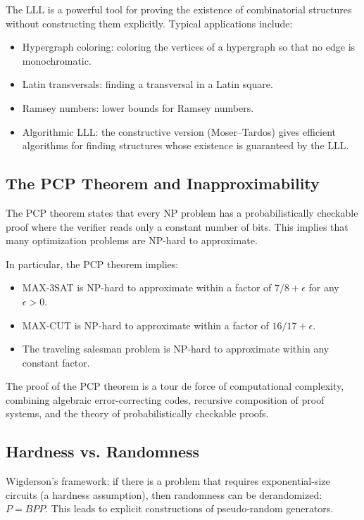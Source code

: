 The LLL is a powerful tool for proving the existence of combinatorial structures without constructing them explicitly. Typical applications include:
\begin{itemize}
\item Hypergraph coloring: coloring the vertices of a hypergraph so that no edge is monochromatic.
\item Latin transversals: finding a transversal in a Latin square.
\item Ramsey numbers: lower bounds for Ramsey numbers.
\item Algorithmic LLL: the constructive version (Moser--Tardos) gives efficient algorithms for finding structures whose existence is guaranteed by the LLL.
\end{itemize}

\subsection{The PCP Theorem and Inapproximability}

The PCP theorem states that every NP problem has a probabilistically checkable proof where the verifier reads only a constant number of bits. This implies that many optimization problems are NP-hard to approximate.

In particular, the PCP theorem implies:
\begin{itemize}
\item MAX-3SAT is NP-hard to approximate within a factor of $7/8 + \epsilon$ for any $\epsilon > 0$.
\item MAX-CUT is NP-hard to approximate within a factor of $16/17 + \epsilon$.
\item The traveling salesman problem is NP-hard to approximate within any constant factor.
\end{itemize}

The proof of the PCP theorem is a tour de force of computational complexity, combining algebraic error-correcting codes, recursive composition of proof systems, and the theory of probabilistically checkable proofs.

\subsection{Hardness vs. Randomness}

Wigderson's framework: if there is a problem that requires exponential-size circuits (a hardness assumption), then randomness can be derandomized: $P = BPP$. This leads to explicit constructions of pseudo-random generators.


